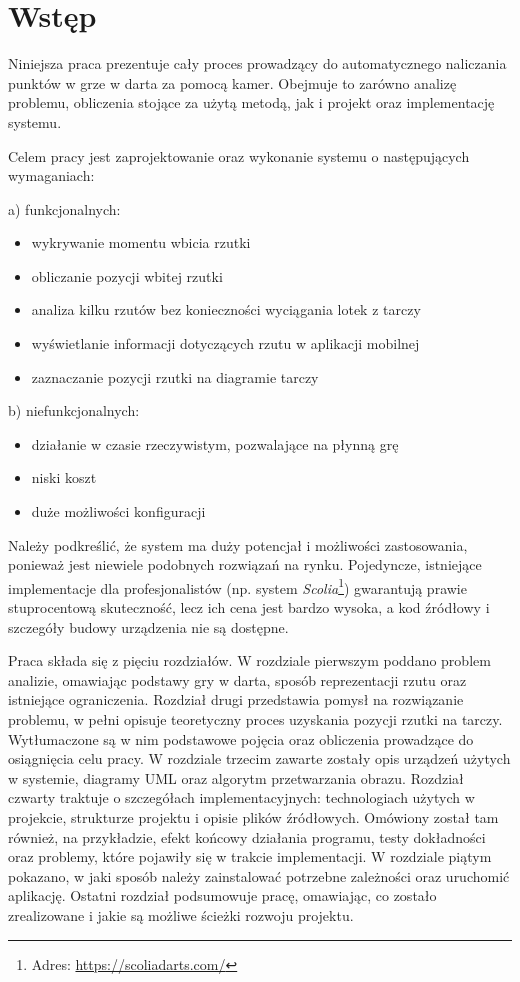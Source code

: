 \chapter{Wstęp}
\thispagestyle{chapterBeginStyle}

Niniejsza praca prezentuje cały proces prowadzący do automatycznego naliczania punktów w grze w darta za pomocą kamer. Obejmuje to zarówno analizę problemu, obliczenia stojące za użytą metodą, jak i projekt oraz implementację systemu. 

Celem pracy jest zaprojektowanie oraz wykonanie systemu o następujących wymaganiach:
\vspace{2mm}

\noindent a) funkcjonalnych:
\begin{itemize}
  \item wykrywanie momentu wbicia rzutki
  \item obliczanie pozycji wbitej rzutki
  \item analiza kilku rzutów bez konieczności wyciągania lotek z tarczy
  \item wyświetlanie informacji dotyczących rzutu w aplikacji mobilnej
  \item zaznaczanie pozycji rzutki na diagramie tarczy
  
\end{itemize}

\noindent b) niefunkcjonalnych:
\begin{itemize}
  \item działanie w czasie rzeczywistym, pozwalające na płynną grę
  \item niski koszt
  \item duże możliwości konfiguracji
\end{itemize}

Należy podkreślić, że system ma duży potencjał i możliwości zastosowania, ponieważ jest niewiele podobnych rozwiązań na rynku. Pojedyncze, istniejące implementacje dla profesjonalistów (np. system \textit{Scolia}\footnote{Adres: \url{https://scoliadarts.com/}}) gwarantują prawie stuprocentową skuteczność, lecz ich cena jest bardzo wysoka, a kod źródłowy i szczegóły budowy urządzenia nie są dostępne.

Praca składa się z pięciu rozdziałów. W rozdziale pierwszym poddano problem analizie, omawiając podstawy gry w darta, sposób reprezentacji rzutu oraz istniejące ograniczenia. Rozdział drugi przedstawia pomysł na rozwiązanie problemu, w pełni opisuje teoretyczny proces uzyskania pozycji rzutki na tarczy. Wytłumaczone są w nim podstawowe pojęcia oraz obliczenia prowadzące do osiągnięcia celu pracy. W rozdziale trzecim zawarte zostały opis urządzeń użytych w systemie, diagramy UML oraz algorytm przetwarzania obrazu. Rozdział czwarty traktuje o szczegółach implementacyjnych: technologiach użytych w projekcie, strukturze projektu i opisie plików źródłowych. Omówiony został tam również, na przykładzie, efekt końcowy działania programu, testy dokładności oraz problemy, które pojawiły się w trakcie implementacji. W rozdziale piątym pokazano, w jaki sposób należy zainstalować potrzebne zależności oraz uruchomić aplikację. Ostatni rozdział podsumowuje pracę, omawiając, co zostało zrealizowane i jakie są możliwe ścieżki rozwoju projektu.